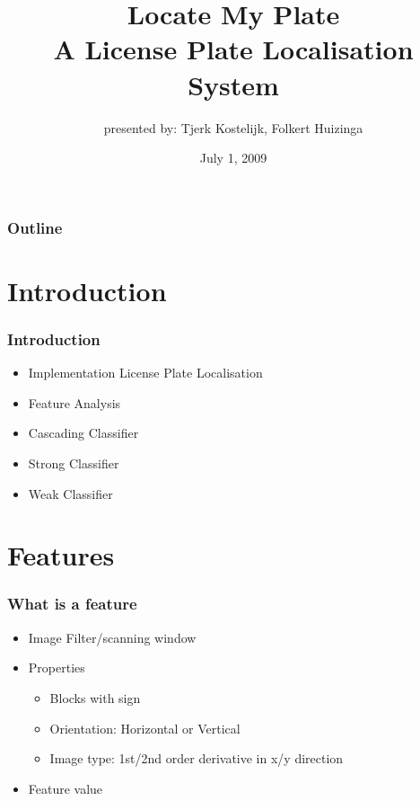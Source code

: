 \documentclass{beamer}
\title{Locate My Plate \\ A License Plate Localisation System}
\subtitle{presented by: Tjerk Kostelijk, Folkert Huizinga}
\date{July 1, 2009}
\begin{document}
\frame{\titlepage}

\setcounter{tocdepth}{1}

\frame
{
  \frametitle{Outline}
  \small
  \tableofcontents
  \normalsize
}

\setcounter{tocdepth}{2}


\section{Introduction}
\frame
{
  \frametitle{Introduction}
	
  \begin{itemize}
  \item <+-| alert@+> Implementation License Plate Localisation
  \item <+-| alert@+> Feature Analysis
  \item <+-| alert@+> Cascading Classifier
  \item <+-| alert@+> Strong Classifier
  \item <+-| alert@+> Weak Classifier
  \end{itemize}
}

\section{Features}
\frame
{
  \frametitle{What is a feature}
	
  \begin{itemize}
  \item <+-| alert@+> Image Filter/scanning window
  \item <+-| alert@+> Properties
		\begin{itemize}
			\item <+-| alert@+> Blocks with sign 
			\item <+-| alert@+> Orientation: Horizontal or Vertical
			\item <+-| alert@+> Image type: 1st/2nd order derivative in x/y direction
		\end{itemize}
  \item <+-| alert@+> Feature value
  \end{itemize}
}
\end{document}
